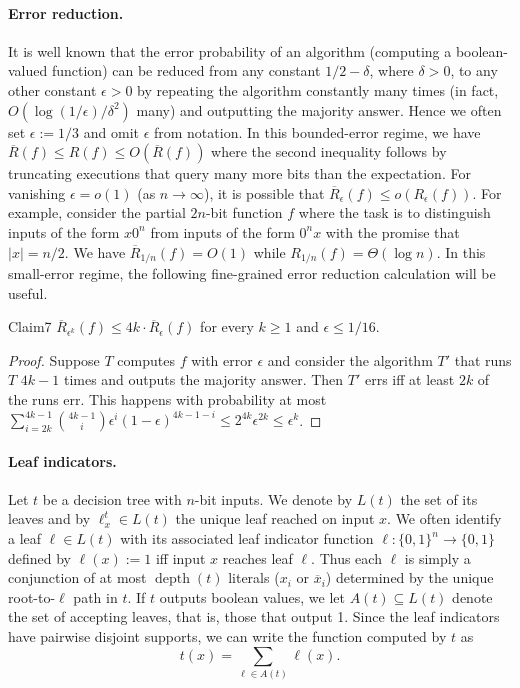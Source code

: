 \paragraph{Error reduction.} It is well known that the error probability of an algorithm (computing a boolean-valued function) can be reduced from any constant $1/2-\delta$, where $\delta>0$, to any other constant $\epsilon>0$ by repeating the algorithm constantly many times (in fact, $O(\log(1/\epsilon)/\delta^2)$ many) and outputting the majority answer. Hence we often set $\epsilon:=1/3$ and omit $\epsilon$ from notation. In this bounded-error regime, we have $\overline R(f)\le R(f)\le O(\overline R(f))$ where the second inequality follows by truncating executions that query many more bits than the expectation. For vanishing $\epsilon=o(1)$ (as $n\to\infty$), it is possible that $\overline R_\epsilon(f)\le o(R_\epsilon(f))$. For example, consider the partial $2n$-bit function $f$ where the task is to distinguish inputs of the form $x0^n$ from inputs of the form $0^nx$ with the promise that $|x|=n/2$. We have $\overline R_{1/n}(f)=O(1)$ while $R_{1/n}(f)=\Theta(\log n)$. In this small-error regime, the following fine-grained error reduction calculation will be useful.
\begin{authorclaim}{Claim7}
$\overline R_{\epsilon^k}(f)\le4k\cdot\overline R_\epsilon(f)$ for every $k\ge1$ and $\epsilon\le1/16$.
\end{authorclaim}
\begin{proof}
Suppose $T$ computes $f$ with error $\epsilon$ and consider the algorithm $T'$ that runs $T$ $4k-1$ times and outputs the majority answer. Then $T'$ errs iff at least $2k$ of the runs err. This happens with probability at most $\sum_{i=2k}^{4k-1}\binom{4k-1}i\epsilon^i(1-\epsilon)^{4k-1-i}\le2^{4k}\epsilon^{2k}\le\epsilon^k$.
\end{proof}
\paragraph{Leaf indicators.} Let $t$ be a decision tree with $n$-bit inputs. We denote by $L(t)$ the set of its leaves and by $\ell_x^t\in L(t)$ the unique leaf reached on input $x$. We often identify a leaf $\ell\in L(t)$ with its associated leaf indicator function $\ell:\{0,1\}^n\to\{0,1\}$ defined by $\ell(x):=1$ iff input $x$ reaches leaf $\ell$. Thus each $\ell$ is simply a conjunction of at most $\operatorname{depth}(t)$ literals ($x_i$ or $\overline x_i$) determined by the unique root-to-$\ell$ path in $t$. If $t$ outputs boolean values, we let $A(t)\subseteq L(t)$ denote the set of accepting leaves, that is, those that output 1. Since the leaf indicators have pairwise disjoint supports, we can write the function computed by $t$ as
\begin{equation}\tag{1}t(x)=\sum_{\ell\in A(t)}\ell(x).\end{equation}
